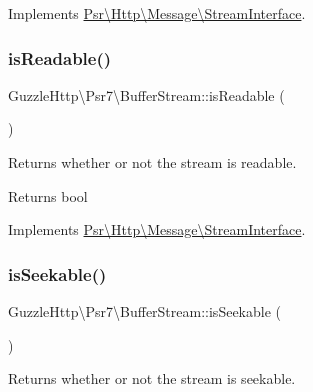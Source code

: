 Implements \hyperlink{interfacePsr_1_1Http_1_1Message_1_1StreamInterface_a85b9ff28e3ee39d95a47e623d866cf76}{Psr\textbackslash{}\+Http\textbackslash{}\+Message\textbackslash{}\+Stream\+Interface}.

\mbox{\label{classGuzzleHttp_1_1Psr7_1_1BufferStream_a4c7c5d714b07099f0f765573870cc70a}} 
\subsubsection{\texorpdfstring{is\+Readable()}{isReadable()}}
{\footnotesize\ttfamily Guzzle\+Http\textbackslash{}\+Psr7\textbackslash{}\+Buffer\+Stream\+::is\+Readable (\begin{DoxyParamCaption}{ }\end{DoxyParamCaption})}

Returns whether or not the stream is readable.

\begin{DoxyReturn}{Returns}
bool 
\end{DoxyReturn}


Implements \hyperlink{interfacePsr_1_1Http_1_1Message_1_1StreamInterface_aecf78407aa241622ae200a9faa471d32}{Psr\textbackslash{}\+Http\textbackslash{}\+Message\textbackslash{}\+Stream\+Interface}.

\mbox{\label{classGuzzleHttp_1_1Psr7_1_1BufferStream_a0ce11381069f05f76393a5f032b432f7}} 
\subsubsection{\texorpdfstring{is\+Seekable()}{isSeekable()}}
{\footnotesize\ttfamily Guzzle\+Http\textbackslash{}\+Psr7\textbackslash{}\+Buffer\+Stream\+::is\+Seekable (\begin{DoxyParamCaption}{ }\end{DoxyParamCaption})}

Returns whether or not the stream is seekable.

